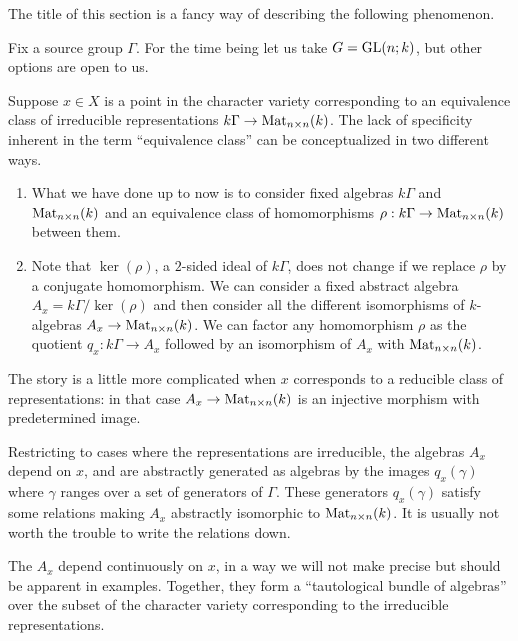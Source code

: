 \documentclass[11pt, oneside, usenames, dvipsnames, svgnames, table, draft]{amsart}
\begin{document}
The title of this section is a fancy way of describing the following phenomenon.

Fix a source group $\Gamma$. For the time being let us take $G = \operatorname{GL}(n; k)$, but other options
are open to us.

Suppose $x \in X$ is a point in the character variety corresponding to an equivalence class of irreducible
representations $k \Gamma \to \operatorname{Mat}_{n \times n}(k)$. The lack of specificity inherent in the term ``equivalence class''
can be conceptualized in two different ways.
\begin{enumerate}
\item What we have done up to now is to consider fixed algebras $k \Gamma$ and $\operatorname{Mat}_{n \times n}(k)$ and an equivalence
  class of homomorphisms $\rho : k \Gamma \to \operatorname{Mat}_{n \times n}(k)$ between them.
\item Note that $\ker(\rho)$, a $2$-sided ideal of $k \Gamma$, does not change if we replace $\rho$ by a conjugate
  homomorphism. We can consider a fixed abstract algebra $A_x = k \Gamma / \ker(\rho)$ and then consider all the
  different isomorphisms of $k$-algebras $A_x \to \operatorname{Mat}_{n \times n}(k)$. We can factor any homomorphism $\rho$
  as the quotient $q_x : k \Gamma \to A_x$ followed by an isomorphism of $A_x$ with $\operatorname{Mat}_{n \times n}(k)$.
\end{enumerate}

\begin{remark}
  The story is a little more complicated when $x$ corresponds to a reducible class of representations: in that case
  $A_x \to \operatorname{Mat}_{n \times n}(k)$ is an injective morphism with predetermined image.
\end{remark}

Restricting to cases where the representations are irreducible, the algebras $A_x$ depend on $x$, and are abstractly
generated as algebras by the images $q_x(\gamma)$ where $\gamma$ ranges over a set of generators of  $\Gamma$. These
generators $q_x(\gamma)$ satisfy some relations making $A_x$ abstractly isomorphic to $\operatorname{Mat}_{n \times n}(k)$. It is
usually not worth the trouble to write the relations down.

The $A_x$ depend continuously on $x$, in a way we will not make precise but should be apparent in examples. Together,
they form a ``tautological bundle of algebras'' over the subset of the character variety corresponding to the
irreducible representations.





\printbibliography


 
\end{document}
